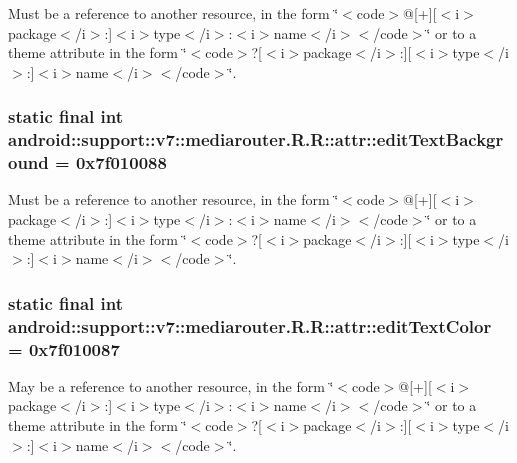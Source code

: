 Must be a reference to another resource, in the form \char`\"{}$<$code$>$@\mbox{[}+\mbox{]}\mbox{[}$<$i$>$package$<$/i$>$:\mbox{]}$<$i$>$type$<$/i$>$:$<$i$>$name$<$/i$>$$<$/code$>$\char`\"{} or to a theme attribute in the form \char`\"{}$<$code$>$?\mbox{[}$<$i$>$package$<$/i$>$:\mbox{]}\mbox{[}$<$i$>$type$<$/i$>$:\mbox{]}$<$i$>$name$<$/i$>$$<$/code$>$\char`\"{}. \hypertarget{classandroid_1_1support_1_1v7_1_1mediarouter_1_1_r_1_1attr_6434b58c30000b550abc678372c4f8b3}{
\subsubsection[{editTextBackground}]{\setlength{\rightskip}{0pt plus 5cm}static final int android::support::v7::mediarouter.R.R::attr::editTextBackground = 0x7f010088}}
\label{classandroid_1_1support_1_1v7_1_1mediarouter_1_1_r_1_1attr_6434b58c30000b550abc678372c4f8b3}


Must be a reference to another resource, in the form \char`\"{}$<$code$>$@\mbox{[}+\mbox{]}\mbox{[}$<$i$>$package$<$/i$>$:\mbox{]}$<$i$>$type$<$/i$>$:$<$i$>$name$<$/i$>$$<$/code$>$\char`\"{} or to a theme attribute in the form \char`\"{}$<$code$>$?\mbox{[}$<$i$>$package$<$/i$>$:\mbox{]}\mbox{[}$<$i$>$type$<$/i$>$:\mbox{]}$<$i$>$name$<$/i$>$$<$/code$>$\char`\"{}. \hypertarget{classandroid_1_1support_1_1v7_1_1mediarouter_1_1_r_1_1attr_9c8570b9464b710a1635f919b1e2b7de}{
\subsubsection[{editTextColor}]{\setlength{\rightskip}{0pt plus 5cm}static final int android::support::v7::mediarouter.R.R::attr::editTextColor = 0x7f010087}}
\label{classandroid_1_1support_1_1v7_1_1mediarouter_1_1_r_1_1attr_9c8570b9464b710a1635f919b1e2b7de}


May be a reference to another resource, in the form \char`\"{}$<$code$>$@\mbox{[}+\mbox{]}\mbox{[}$<$i$>$package$<$/i$>$:\mbox{]}$<$i$>$type$<$/i$>$:$<$i$>$name$<$/i$>$$<$/code$>$\char`\"{} or to a theme attribute in the form \char`\"{}$<$code$>$?\mbox{[}$<$i$>$package$<$/i$>$:\mbox{]}\mbox{[}$<$i$>$type$<$/i$>$:\mbox{]}$<$i$>$name$<$/i$>$$<$/code$>$\char`\"{}. 


